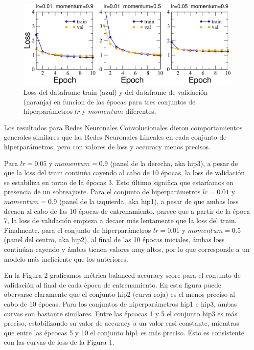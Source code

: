 \documentclass[a4paper,10pt]{article}
\begin{document}
\begin{figure}[h]
\centering
\includegraphics[scale=0.5]{data/loss-conv.pdf}
\caption{Loss del dataframe train (azul) y del dataframe de validación (naranja) en funcion de las épocas para tres conjuntos de hiperparámetros $lr$ y $momentum$ diferentes.}
\label{fig01}
\end{figure}

Los resultados para Redes Neuronales Convolucionales dieron comportamientos generales similares que las Redes Neuronales Lineales en cada conjunto de hiperparámetros, pero con valores de loss y accuracy menos precisos.

Para $lr=0.05$ y $momentum=0.9$ (panel de la derecha, aka hip3), a pesar de que la loss del train continúa cayendo al cabo de 10 épocas, la loss de validación se estabiliza en torno de la épocas 3. Esto último significa que estaríamos en presencia de un sobreajuste. Para el conjunto de hiperparámetros $lr=0.01$ y $momentum=0.9$ (panel de la izquierda, aka hip1), a pesar de que ambas loss decaen al cabo de las 10 épocas de entrenamiento, parece que a partir de la época 7, la loss de validación empieza a decaer más lentamente que la loss del train. Finalmente, para el conjunto de hiperparámetros $lr=0.01$ y $momentum=0.5$ (panel del centro, aka hip2), al final de las 10 épocas iniciales, ámbas loss continúan cayendo y ámbas tienen valores muy altos, por lo que corresponde a un modelo más ineficiente que los anteriores. 

En la Figura 2 graficamos métrica balanced accuracy score para el conjunto de validación al final de cada época de entrenamiento. En esta figura puede obervarse claramente que el conjunto hip2 (curva roja) es el menos preciso al cabo de 10 épocas. Para los conjuntos de hiperparámetros hip1 e hip3, ámbas curvas son bastante similares. Entre las épcocas 
1 y 5 el conjunto hip3 es más preciso, estabilizando su valor de accuracy a un valor casi constante, miemtras que entre las épcocas 5 y 10 el conjunto hip1 es más preciso. Esto es consistente con las curvas de loss de la Figura 1.
\end{document}
